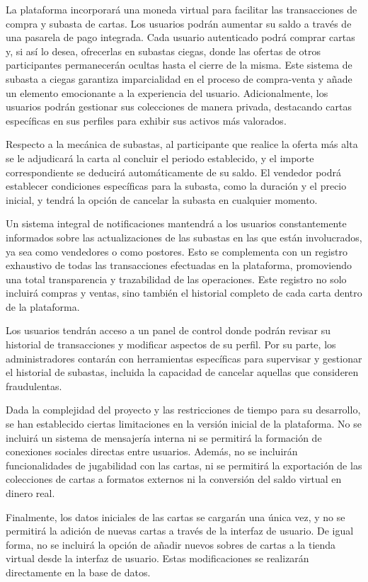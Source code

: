 La plataforma incorporará una moneda virtual para facilitar las transacciones de compra y subasta de cartas. Los usuarios podrán aumentar su saldo a través de una pasarela de pago integrada. 
Cada usuario autenticado podrá comprar cartas y, si así lo desea, ofrecerlas en subastas ciegas, donde las ofertas de otros participantes permanecerán ocultas hasta el cierre de la misma. 
Este sistema de subasta a ciegas garantiza imparcialidad en el proceso de compra-venta y añade un elemento emocionante a la experiencia del usuario. 
Adicionalmente, los usuarios podrán gestionar sus colecciones de manera privada, destacando cartas específicas en sus perfiles para exhibir sus activos más valorados.


Respecto a la mecánica de subastas, al participante que realice la oferta más alta se le adjudicará la carta al concluir el periodo establecido, y el importe correspondiente se deducirá 
automáticamente de su saldo. El vendedor podrá establecer condiciones específicas para la subasta, como la duración y el precio inicial, y 
tendrá la opción de cancelar la subasta en cualquier momento.


Un sistema integral de notificaciones mantendrá a los usuarios constantemente informados sobre las actualizaciones de las subastas en las que están involucrados, 
ya sea como vendedores o como postores. Esto se complementa con un registro exhaustivo de todas las transacciones efectuadas en la plataforma, promoviendo una total transparencia y trazabilidad 
de las operaciones. Este registro no solo incluirá compras y ventas, sino también el historial completo de cada carta dentro de la plataforma.


Los usuarios tendrán acceso a un panel de control donde podrán revisar su historial de transacciones y modificar aspectos de su perfil. 
Por su parte, los administradores contarán con herramientas específicas para supervisar y gestionar el historial de subastas, incluida la capacidad de cancelar aquellas que consideren fraudulentas.


Dada la complejidad del proyecto y las restricciones de tiempo para su desarrollo, se han establecido ciertas limitaciones en la versión inicial de la plataforma.
No se incluirá un sistema de mensajería interna ni se permitirá la formación de conexiones sociales directas entre usuarios. 
Además, no se incluirán funcionalidades de jugabilidad con las cartas, ni se permitirá la exportación de las colecciones de cartas a formatos externos ni la conversión del saldo virtual en dinero real.


Finalmente, los datos iniciales de las cartas se cargarán una única vez, y no se permitirá la adición de nuevas cartas a través de la interfaz de usuario. 
De igual forma, no se incluirá la opción de añadir nuevos sobres de cartas a la tienda virtual desde la interfaz de usuario. Estas modificaciones se realizarán directamente en la base de datos.



